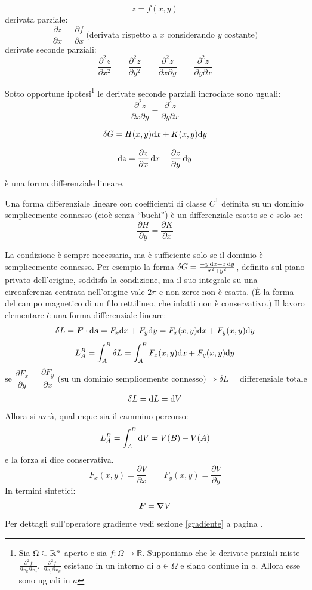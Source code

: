 \[z=f(x,y)\]
derivata parziale:
\[\frac{\partial z}{\partial x}=\frac{\partial f}{\partial x}\ \text{(derivata rispetto a $x$ considerando $y$ costante)}\]
derivate seconde parziali:
\[
  \frac{\partial^2 z}{\partial x^2}\qquad \frac{\partial^2
    z}{\partial y^2}\qquad \frac{\partial^2 z}{\partial x\partial
    y}\qquad\frac{\partial^2 z}{\partial y\partial x}\]
\begin{Teo}[Schwarz]
  Sotto opportune ipotesi\footnote{Sia $\Omega\subseteq\mathbb{R}^n$ aperto e sia $f:\Omega\to\mathbb{R}$. Supponiamo che le derivate parziali miste $\frac{\partial^2 f}{\partial x_k\partial x_j}$, $\frac{\partial^2 f}{\partial x_j\partial x_k}$ esistano in un intorno di $a\in\Omega$ e siano continue in $a$. Allora esse sono uguali in $a$} le derivate seconde parziali incrociate sono uguali:
  \[\frac{\partial^2 z}{\partial x\partial y}=\frac{\partial^2 z}{\partial y\partial x}\]
\end{Teo}
\begin{Def}
  \[\delta G=H(x,y)\mathrm{d} x+K(x,y)\mathrm{d} y\]
\end{Def}
\begin{Def}
  \[\mathrm{d} z=\frac{\partial z}{\partial x}\,\mathrm{d} x+\frac{\partial z}{\partial y}\,\mathrm{d} y\]
\end{Def}
è una forma differenziale lineare.
\begin{Teo}
  Una forma differenziale lineare con coefficienti di classe $C^1$ definita su un dominio semplicemente connesso (cioè senza ``buchi'') è un differenziale esatto se e
  solo se:
  \[\frac{\partial H}{\partial y}=\frac{\partial K}{\partial x}\]
\end{Teo}
La condizione è sempre necessaria, ma è sufficiente solo se il dominio è semplicemente connesso. Per esempio la forma $\delta G=\frac{-y\,\mathrm{d} x+x\,\mathrm{d} y}{x^2+y^2}$, definita sul piano privato dell'origine, soddisfa la condizione, ma il suo integrale su una circonferenza centrata nell'origine vale $2\pi$ e non zero: non è esatta. (È la forma del campo magnetico di un filo rettilineo, che infatti non è conservativo.)
Il lavoro elementare è una forma differenziale lineare:
\[\delta L=\boldsymbol{F}\cdot \mathrm{d} \boldsymbol{s}=F_x\mathrm{d} x+F_y\mathrm{d} y=F_x(x,y)\mathrm{d} x+F_y(x,y)\mathrm{d} y\]
\[L_A^B=\int_A^B\delta L=\int_A^B F_x(x,y)\mathrm{d} x+F_y(x,y)\mathrm{d} y\]
\[\text{se } \frac{\partial F_x}{\partial y}=\frac{\partial F_y}{\partial x} \text{ (su un dominio semplicemente connesso)}\Rightarrow \delta L= \text{differenziale totale}\]
\[\delta L=\mathrm{d} L=\mathrm{d} V\]
Allora si avrà, qualunque sia il cammino percorso:
\[L_A^B=\int_A^B \mathrm{d} V=V(B)-V(A)\]
e la forza si dice conservativa.
\[F_x(x,y)=\frac{\partial V}{\partial x}\qquad F_y(x,y)=\frac{\partial V}{\partial y}\]
In termini sintetici:
\[\boldsymbol{F}=\boldsymbol{\nabla} V\]
Per dettagli sull'operatore
gradiente vedi sezione \ref{gradiente} a pagina
\pageref{gradiente}.

